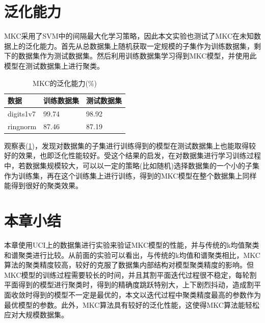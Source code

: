 \section{泛化能力}
MKC采用了SVM中的间隔最大化学习策略，因此本文实验也测试了MKC在未知数据上的泛化能力。首先从总数据集上随机获取一定规模的子集作为训练数据集，剩下的数据集作为测试数据集。然后利用训练数据集学习得到MKC模型，并使用此模型在测试数据集上进行聚类。
\begin{table}[!htbp]
\caption{MKC的泛化能力(\%)}
\centering
\small
\renewcommand\arraystretch{1.5}
\begin{tabular}{|p{2cm}<{\centering}|p{2.5cm}<{\centering}|p{2.5cm}<{\centering}|}
\hline
数据 & 训练数据集 & 测试数据集 \\
\hline
digits1v7 & 99.74 & 98.92 \\
\hline
ringnorm & 87.46 & 87.19  \\
\hline
\end{tabular}
\label{tab:generalize}
\end{table} 

观察表(\ref{tab:generalize})，发现对数据集的子集进行训练得到的模型在测试数据集上也能取得较好的效果，也即泛化性能较好。受这个结果的启发，在对数据集进行学习训练过程中，若数据集规模较大，可以以一定的策略(比如随机)选择数据集的一个小的子集作为训练集，再在这个训练集上进行训练，得到的MKC模型在整个数据集上同样能得到很好的聚类效果。

\section{本章小结}
本章使用UCI上的数据集进行实验来验证MKC模型的性能，并与传统的k均值聚类和谱聚类进行比较。从前面的实验可以看出，与传统的k均值和谱聚类相比，MKC算法的聚类精度较高，较好的克服了数据集内部结构对模型聚类精度的影响。但MKC模型的训练过程需要较长的时间，并且其割平面迭代过程很不稳定，每轮割平面得到的模型进行聚类时，得到的精确度跳跃特别大，上下剧烈抖动，造成割平面收敛时得到的模型不一定是最优的，本文以迭代过程中聚类精度最高的参数作为最优模型的参数。此外，MKC算法具有较好的泛化性能，这使得MKC算法能轻松应对大规模数据集。